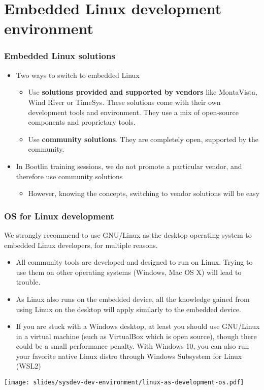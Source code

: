 \section{Embedded Linux development environment}

\begin{frame}
  \frametitle{Embedded Linux solutions}
  \begin{itemize}
  \item Two ways to switch to embedded Linux
    \begin{itemize}
    \item Use {\bf solutions provided and supported by vendors} like
      MontaVista, Wind River or TimeSys. These solutions come with
      their own development tools and environment. They use a mix of
      open-source components and proprietary tools.
    \item Use {\bf community solutions}. They are completely open,
      supported by the community.
    \end{itemize}
  \item In Bootlin training sessions, we do not promote a particular
    vendor, and therefore use community solutions
    \begin{itemize}
    \item However, knowing the concepts, switching to vendor solutions will be easy
    \end{itemize}
  \end{itemize}
\end{frame}

\begin{frame}
  \frametitle{OS for Linux development}
  We strongly recommend to use GNU/Linux as the desktop operating
  system to embedded Linux developers, for multiple reasons.
  \begin{itemize}
  \item All community tools are developed and designed to run on
    Linux. Trying to use them on other operating systems (Windows, Mac
    OS X) will lead to trouble.
  \item As Linux also runs on the embedded device, all the knowledge
    gained from using Linux on the desktop will apply similarly to the
    embedded device.
  \item If you are stuck with a Windows desktop, at least you should
    use GNU/Linux in a virtual machine (such as VirtualBox which is open
    source), though there could be a small performance penalty.
    With Windows 10, you can also run your favorite native Linux distro through
    Windows Subsystem for Linux (WSL2)
  \end{itemize}
  \begin{center}
    \texttt{[image: slides/sysdev-dev-environment/linux-as-development-os.pdf]}
  \end{center}
\end{frame}

